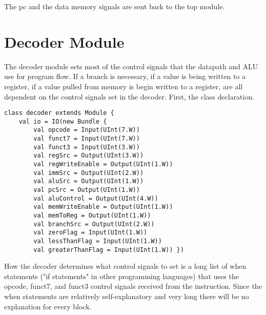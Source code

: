 \documentclass[12pt, letterpaper]{report}
\begin{document}
\noindent The pc and the data memory signals are sent back to the top module.

\section{Decoder Module}
The decoder module sets most of the control signals that the datapath and ALU use for program flow.
If a branch is necessary, if a value is being written to a register, if a value pulled from memory is begin written to a register, are all dependent on the control signals set in the decoder. 
First, the class declaration.

\begin{lstlisting}[style=scala]
class decoder extends Module {
	val io = IO(new Bundle {
		val opcode = Input(UInt(7.W))
		val funct7 = Input(UInt(7.W))
		val funct3 = Input(UInt(3.W))
		val regSrc = Output(UInt(3.W))
		val regWriteEnable = Output(UInt(1.W))
		val immSrc = Output(UInt(2.W))
		val aluSrc = Output(UInt(1.W))
		val pcSrc = Output(UInt(1.W))
		val aluControl = Output(UInt(4.W))
		val memWriteEnable = Output(UInt(1.W))
		val memToReg = Output(UInt(1.W))
		val branchSrc = Output(UInt(2.W))
		val zeroFlag = Input(UInt(1.W))
		val lessThanFlag = Input(UInt(1.W))
		val greaterThanFlag = Input(UInt(1.W)) })
\end{lstlisting}

\noindent How the decoder determines what control signals to set is a long list of when statements
("if statements" in other programming languages) that uses the opcode, funct7, and funct3 control signals received from the 
instruction. Since the when statements are relatively self-explanatory and very long there will be no explanation for every block.
\end{document}
